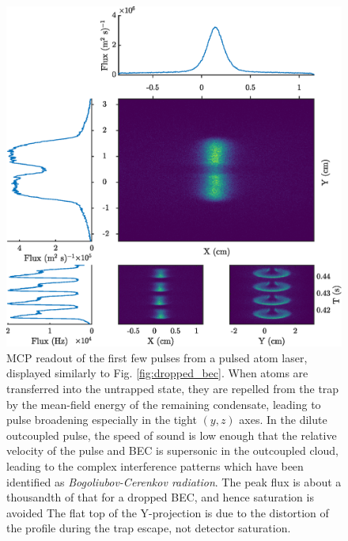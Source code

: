 	 \newpage
	 \begin{figure}
	 	\centering
	 	\includegraphics[width=\textwidth]{fig/apparatus/dropped_pal}
	 	\caption{MCP readout of the first few pulses from a pulsed atom laser, displayed similarly to Fig. \ref{fig:dropped_bec}. When atoms are transferred into the untrapped state, they are repelled from the trap by the mean-field energy of the remaining condensate, leading to pulse broadening especially in the tight $(y,z)$ axes. In the dilute outcoupled pulse, the speed of sound is low enough that the relative velocity of the pulse and BEC is supersonic in the outcoupled cloud, leading to the complex interference patterns which have been identified as \emph{Bogoliubov-Cerenkov radiation}\cite{Henson18_BCR}. The peak flux is about a thousandth of that for a dropped BEC, and hence saturation is avoided
	 	The flat top of the Y-projection is due to the distortion of the profile during the trap escape, not detector saturation.}
	 	\label{fig:dropped_pal}
	 \end{figure}
	 \newpage

